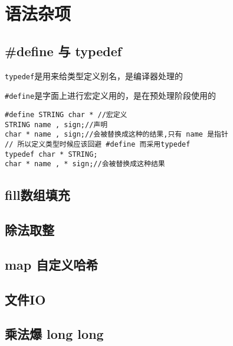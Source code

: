 \section{语法杂项}

\subsection{#define 与 typedef}
\verb|typedef|是用来给类型定义别名，是编译器处理的

\verb|#define|是字面上进行宏定义用的，是在预处理阶段使用的
\begin{lstlisting}
#define STRING char * //宏定义
STRING name , sign;//声明
char * name , sign;//会被替换成这种的结果,只有 name 是指针
// 所以定义类型时候应该回避 #define 而采用typedef
typedef char * STRING;
char * name , * sign;//会被替换成这种结果
\end{lstlisting}

\subsection{fill数组填充}


\subsection{除法取整}


\subsection{map 自定义哈希}


\subsection{文件IO}


\subsection{乘法爆 long long }

